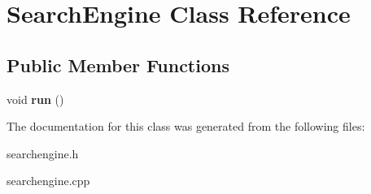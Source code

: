 \hypertarget{classSearchEngine}{}\section{Search\+Engine Class Reference}
\label{classSearchEngine}
\subsection*{Public Member Functions}
\begin{DoxyCompactItemize}
\item 
\mbox{\label{classSearchEngine_a1808d0f69adc101d7b6847f4ac13a970}} 
void {\bfseries run} ()
\end{DoxyCompactItemize}


The documentation for this class was generated from the following files\+:\begin{DoxyCompactItemize}
\item 
searchengine.\+h\item 
searchengine.\+cpp\end{DoxyCompactItemize}
